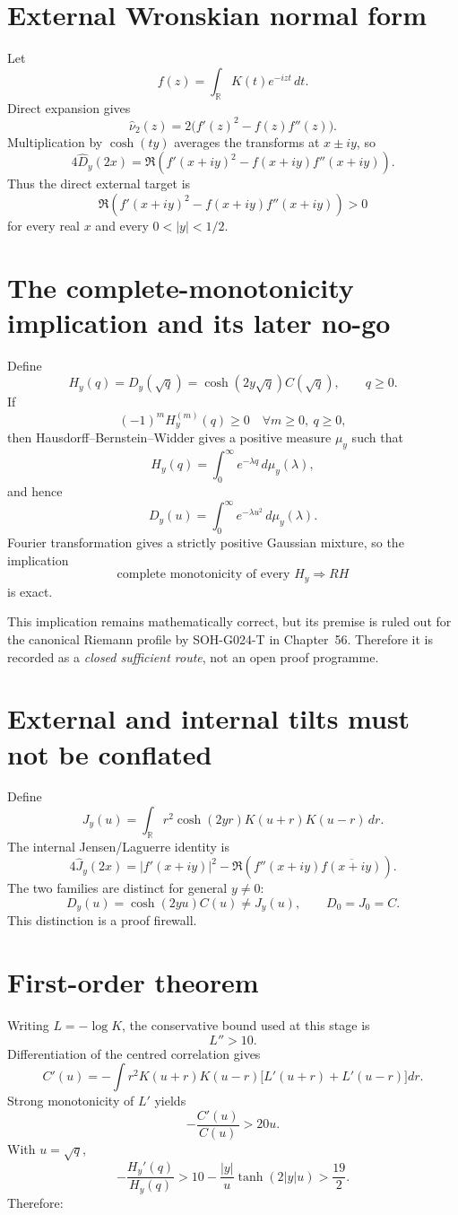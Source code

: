 \section{External Wronskian normal form}
Let
\[
f(z)=\int_{\mathbb R}K(t)e^{-izt}\,dt.
\]
Direct expansion gives
\[
\boxed{\widehat\nu_2(z)=2\bigl(f'(z)^2-f(z)f''(z)\bigr).}
\]
Multiplication by $\cosh(ty)$ averages the transforms at $x\pm iy$, so
\[
\boxed{4\widehat D_y(2x)=\Re\!\left(f'(x+iy)^2-f(x+iy)f''(x+iy)\right).}
\]
Thus the direct external target is
\[
\boxed{\Re\!\left(f'(x+iy)^2-f(x+iy)f''(x+iy)\right)>0}
\]
for every real $x$ and every $0<|y|<1/2$.

\section{The complete-monotonicity implication and its later no-go}
Define
\[
\boxed{H_y(q)=D_y(\sqrt q)=\cosh(2y\sqrt q)C(\sqrt q),\qquad q\ge0.}
\]
If
\[
(-1)^mH_y^{(m)}(q)\ge0
\quad\forall m\ge0,\ q\ge0,
\]
then Hausdorff--Bernstein--Widder gives a positive measure $\mu_y$ \citep{schilling2010bernstein} such that
\[
H_y(q)=\int_0^\infty e^{-\lambda q}\,d\mu_y(\lambda),
\]
and hence
\[
D_y(u)=\int_0^\infty e^{-\lambda u^2}\,d\mu_y(\lambda).
\]
Fourier transformation gives a strictly positive Gaussian mixture, so the implication
\[
\boxed{\text{complete monotonicity of every }H_y\Longrightarrow RH}
\]
is exact.

This implication remains mathematically correct, but its premise is ruled out for the canonical Riemann profile by SOH-G024-T in Chapter~56. Therefore it is recorded as a \emph{closed sufficient route}, not an open proof programme.

\section{External and internal tilts must not be conflated}
Define
\[
\boxed{J_y(u)=\int_{\mathbb R}r^2\cosh(2yr)K(u+r)K(u-r)\,dr.}
\]
The internal Jensen/Laguerre identity is
\[
\boxed{4\widehat J_y(2x)=|f'(x+iy)|^2-\Re\!\left(f''(x+iy)\overline{f(x+iy)}\right).}
\]
The two families are distinct for general $y\ne0$:
\[
\boxed{D_y(u)=\cosh(2yu)C(u)\neq J_y(u)},
\qquad
\boxed{D_0=J_0=C.}
\]
This distinction is a proof firewall.

\section{First-order theorem}
Writing $L=-\log K$, the conservative bound used at this stage is
\[
L''>10.
\]
Differentiation of the centred correlation gives
\[
C'(u)=-\int r^2K(u+r)K(u-r)\bigl[L'(u+r)+L'(u-r)\bigr]dr.
\]
Strong monotonicity of $L'$ yields
\[
-\frac{C'(u)}{C(u)}>20u.
\]
With $u=\sqrt q$,
\[
-\frac{H_y'(q)}{H_y(q)}
>10-\frac{|y|}{u}\tanh(2|y|u)
>\frac{19}{2}.
\]
Therefore:

